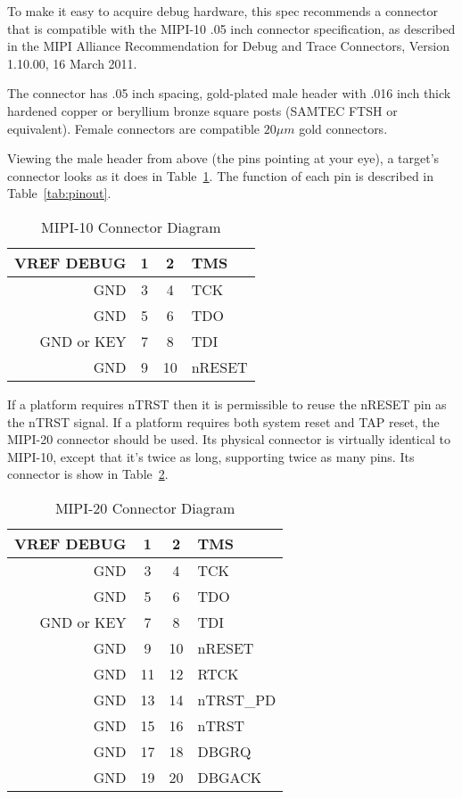 To make it easy to acquire debug hardware, this spec recommends a connector
that is compatible with the MIPI-10 .05 inch connector specification, as described
in the MIPI Alliance Recommendation for Debug and Trace Connectors, Version
1.10.00, 16 March 2011.

The connector has .05 inch spacing, gold-plated male header with .016 inch thick
hardened copper or beryllium bronze square posts (SAMTEC FTSH or equivalent).
Female connectors are compatible $20\mu m$ gold connectors.

Viewing the male header from above (the pins pointing at your eye), a target's
connector looks as it does in Table~\ref{tab:mipiten}.  The function of each pin
is described in Table~\ref{tab:pinout}.

\begin{table}[htp]
    \centering
    \caption{MIPI-10 Connector Diagram}
    \label{tab:mipiten}
    \begin{tabular}{|r|c|c|l|}
        \hline
        VREF DEBUG & 1 & 2 & TMS \\
        \hline
        GND & 3 & 4 & TCK \\
        \hline
        GND & 5 & 6 & TDO \\
        \hline
        GND or KEY & 7 & 8 & TDI \\
        \hline
        GND & 9 & 10 & nRESET \\
        \hline
    \end{tabular}
\end{table}

If a platform requires nTRST then it is permissible to reuse the nRESET pin as
the nTRST signal.  If a platform requires both system reset and TAP reset, the
MIPI-20 connector should be used. Its physical connector is virtually identical
to MIPI-10, except that it's twice as long, supporting twice as many pins. Its
connector is show in Table~\ref{tab:mipitwenty}.

\begin{table}[htp]
    \centering
    \caption{MIPI-20 Connector Diagram}
    \label{tab:mipitwenty}
    \begin{tabular}{|r|c|c|l|}
        \hline
        VREF DEBUG & 1 & 2 & TMS \\
        \hline
        GND & 3 & 4 & TCK \\
        \hline
        GND & 5 & 6 & TDO \\
        \hline
        GND or KEY & 7 & 8 & TDI \\
        \hline
        GND & 9 & 10 & nRESET \\
        \hline
        GND & 11 & 12 & RTCK \\
        \hline
        GND & 13 & 14 & nTRST\_PD \\
        \hline
        GND & 15 & 16 & nTRST \\
        \hline
        GND & 17 & 18 & DBGRQ \\
        \hline
        GND & 19 & 20 & DBGACK \\
        \hline
    \end{tabular}
\end{table}

